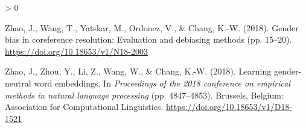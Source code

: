 \documentclass[
  english,
  man,floatsintext]{apa6}
\newlength{\cslhangindent}
\newenvironment{CSLReferences}[2] %
 {%
  \setlength{\parindent}{0pt}
  \ifodd #1 \everypar{\setlength{\hangindent}{\cslhangindent}}\ignorespaces\fi
  \ifnum #2 > 0
  \setlength{\parskip}{#2\baselineskip}
  \fi
 }%
 {}
\begin{document}
\begin{CSLReferences}{1}{0}
\leavevmode\hypertarget{ref-zhao_2018a}{}%
Zhao, J., Wang, T., Yatskar, M., Ordonez, V., \& Chang, K.-W. (2018). Gender bias in coreference resolution: Evaluation and debiasing methods (pp. 15--20). \url{https://doi.org/10.18653/v1/N18-2003}

\leavevmode\hypertarget{ref-zhao_2018b}{}%
Zhao, J., Zhou, Y., Li, Z., Wang, W., \& Chang, K.-W. (2018). Learning gender-neutral word embeddings. In \emph{Proceedings of the 2018 conference on empirical methods in natural language processing} (pp. 4847--4853). Brussels, Belgium: Association for Computational Linguistics. \url{https://doi.org/10.18653/v1/D18-1521}

\end{CSLReferences}

\endgroup
\end{document}
